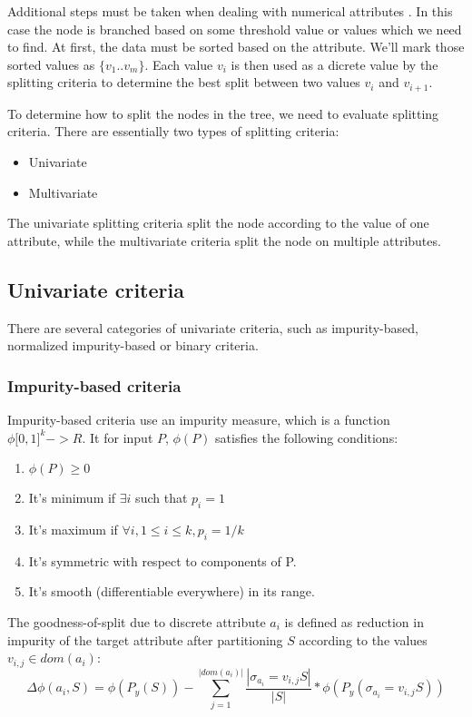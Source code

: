 \documentclass[thesis=B,english]{FITthesis}[2012/10/20]
\begin{document}
			Additional steps must be taken when dealing with numerical attributes \cite{C45-NUMERICAL}.	 In this case the node is branched based on some threshold value or values which we need to find. At first, the data must be sorted based on the attribute. We'll mark those sorted values as \(\{v_1..v_m\}\). Each value \(v_i\) is then used as a dicrete value by the splitting criteria to determine the best split between two values \(v_i\) and \(v_{i+1}\).

			To determine how to split the nodes in the tree, we need to evaluate splitting criteria. There are essentially two types of splitting criteria:
			\begin{itemize}
			\item Univariate
			\item Multivariate
			\end{itemize}
			The univariate splitting criteria split the node according to the value of one attribute, while the multivariate criteria split the node on multiple attributes.

			\subsection{Univariate criteria}
				There are several categories of univariate criteria, such as impurity-based, normalized impurity-based or binary criteria. \cite{DMWithDecisionTrees}
				\subsubsection{Impurity-based criteria}
				Impurity-based criteria use an impurity measure, which is a function \(\phi\lbrack0,1\rbrack^k->R\). It for input \(P\), \(\phi(P)\) satisfies the following conditions:
				\begin{enumerate}
				\item \(\phi(P) \geq 0\)
				\item It's minimum if \(\exists i\) such that \(p_i = 1\)
				\item It's maximum if \(\forall i, 1 \leq i \leq k, p_i = 1/k\)
				\item It's symmetric with respect to components of P.
				\item It's smooth (differentiable everywhere) in its range.	
				\end{enumerate}
				The goodness-of-split due to discrete attribute \(a_i\) is defined as reduction in impurity of the target attribute after partitioning \(S\) according to the values \(v_{i,j} \in \textit{dom}(a_i)\):
				\[
					\Delta\phi(a_i,S)=\phi(P_y(S))-\sum\limits_{j=1}^{|\textit{dom}(a_i)|}{\frac{|\sigma_{a_i}=v_{i,j}S|}{|S|}*\phi\left(P_y\left(\sigma_{a_i}=v_{i,j}S\right)\right)}
				\]
\end{document}
